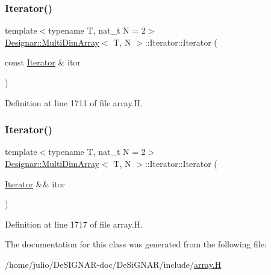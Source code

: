 \mbox{\label{class_designar_1_1_multi_dim_array_1_1_iterator_a2d0c217ae08b2203c50e1d1a01c3af40}} 
\subsubsection{\texorpdfstring{Iterator()}{Iterator()}\hspace{0.1cm}{\footnotesize\ttfamily [4/5]}}
{\footnotesize\ttfamily template$<$typename T, nat\+\_\+t N = 2$>$ \\
\hyperlink{class_designar_1_1_multi_dim_array}{Designar\+::\+Multi\+Dim\+Array}$<$ T, N $>$\+::Iterator\+::\+Iterator (\begin{DoxyParamCaption}\item[{const \hyperlink{class_designar_1_1_multi_dim_array_1_1_iterator}{Iterator} \&}]{itor }\end{DoxyParamCaption})\hspace{0.3cm}{\ttfamily [inline]}}



Definition at line 1711 of file array.\+H.

\mbox{\label{class_designar_1_1_multi_dim_array_1_1_iterator_af6ebf97caae786b50dcb6062b3ab7b0b}} 
\subsubsection{\texorpdfstring{Iterator()}{Iterator()}\hspace{0.1cm}{\footnotesize\ttfamily [5/5]}}
{\footnotesize\ttfamily template$<$typename T, nat\+\_\+t N = 2$>$ \\
\hyperlink{class_designar_1_1_multi_dim_array}{Designar\+::\+Multi\+Dim\+Array}$<$ T, N $>$\+::Iterator\+::\+Iterator (\begin{DoxyParamCaption}\item[{\hyperlink{class_designar_1_1_multi_dim_array_1_1_iterator}{Iterator} \&\&}]{itor }\end{DoxyParamCaption})\hspace{0.3cm}{\ttfamily [inline]}}



Definition at line 1717 of file array.\+H.



The documentation for this class was generated from the following file\+:\begin{DoxyCompactItemize}
\item 
/home/julio/\+De\+S\+I\+G\+N\+A\+R-\/doc/\+De\+Si\+G\+N\+A\+R/include/\hyperlink{array_8_h}{array.\+H}\end{DoxyCompactItemize}

